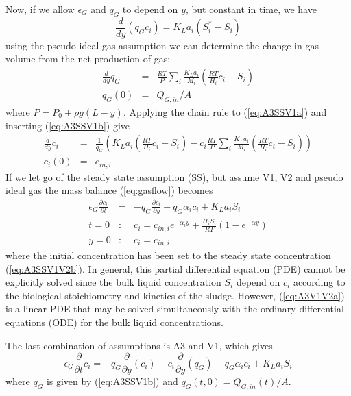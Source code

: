 Now, if we allow $\epsilon_G$ and $q_G$ to depend on $y$, but constant in time, we have
\begin{equation}\label{eq:A3SSV1a}
\frac{d}{dy}(q_Gc_i)=K_La_i(S_i^\ast - S_i)
\end{equation}
using the pseudo ideal gas assumption we can determine the change in gas volume from the net production of gas:
\begin{eqnarray}
\frac{d}{dy}q_G & = & \frac{RT}{P}\sum\limits_i \frac{K_La_i}{M_i}\left(\frac{RT}{H_i}c_i-S_i\right)\label{eq:A3SSV1b}\\
q_G(0) & = & Q_{G,in}/A \label{eq:BCq}
\end{eqnarray}
where $P=P_0+\rho g(L-y)$. Applying the chain rule to (\ref{eq:A3SSV1a}) and inserting (\ref{eq:A3SSV1b}) give
\begin{eqnarray}
\frac{d}{dy}c_i & = & \frac{1}{q_G}\left(K_La_i\left(\frac{RT}{H_i}c_i-S_i\right)-c_i\frac{RT}{P}\sum\limits_i \frac{K_La_i}{M_i}\left(\frac{RT}{H_i}c_i-S_i\right)\right)\label{eq:A3SSV1c}\\
c_i(0) & = & c_{in,i}\label{eq:BCc}
\end{eqnarray}
If we let go of the steady state assumption (SS), but assume V1, V2 and pseudo ideal gas the mass balance (\ref{eq:gasflow}) becomes
\begin{eqnarray}
\epsilon_G\frac{\partial c_i}{\partial t} & = & - q_G\frac{\partial c_i}{\partial y}-q_G\alpha_ic_i + K_La_iS_i \nonumber \\
t=0 & : & c_i=c_{in,i}e^{-\alpha_iy}+\frac{H_iS_i}{RT}(1-e^{-\alpha y})\label{eq:A3V1V2a}\\
y=0 & : & c_i=c_{in,i}\nonumber
\end{eqnarray}
where the initial concentration has been set to the steady state concentration (\ref{eq:A3SSV1V2b}). In general, this partial differential equation (PDE) cannot be explicitly solved since the bulk liquid concentration $S_i$ depend on $c_i$ according to the biological stoichiometry and kinetics of the sludge. However, (\ref{eq:A3V1V2a}) is a linear PDE that may be solved simultaneously with the ordinary differential equations (ODE) for the bulk liquid concentrations.

The last combination of assumptions is A3 and V1, which gives
\begin{equation}\label{eq:A3V1}
\epsilon_G\frac{\partial}{\partial t}c_i = - q_G\frac{\partial}{\partial y}(c_i)- c_i\frac{\partial}{\partial y}(q_G)-q_G\alpha_ic_i + K_La_iS_i
\end{equation}
where $q_G$ is given by (\ref{eq:A3SSV1b}) and $q_G(t,0)=Q_{G,in}(t)/A$.

